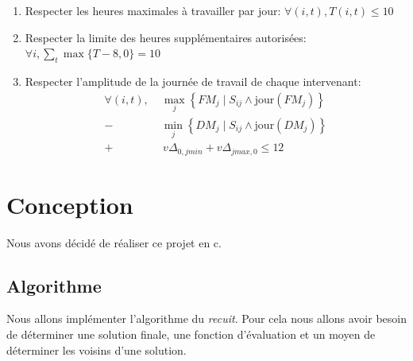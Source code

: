 \documentclass[11pt]{article}
\begin{document}
\begin{enumerate}
    \item Respecter les heures maximales à travailler par jour: $\forall (i, t), T(i, t) \leq 10$
    \item Respecter la limite des heures supplémentaires autorisées: $\forall i, \sum_t \max\{T-8,0\} = 10$
    \item Respecter l'amplitude de la journée de travail de chaque intervenant: \begin{align*}
        \forall (i, t),
            \;& \max_j\left\{FM_j \;|\; S_{ij} \land \text{jour}(FM_j) \right\} \\
            -& \min_j\left\{DM_j \;|\; S_{ij} \land \text{jour}(DM_j) \right\} \\
            +&\, v\Delta_{0,jmin} + v\Delta_{jmax,0} \leq 12
    \end{align*}
\end{enumerate}






\newpage
\section{Conception}

Nous avons décidé de réaliser ce projet en c.


\subsection{Algorithme}

Nous allons implémenter l'algorithme du \emph{recuit}. Pour cela nous allons avoir besoin de déterminer une solution finale, une fonction d'évaluation et un moyen de déterminer les voisins d'une solution.
\end{document}
